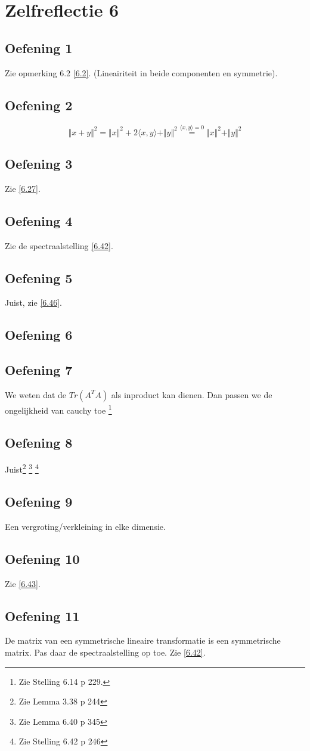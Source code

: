 \documentclass[lineaire_algebra_oplossingen.tex]{subfiles}
\begin{document}
\section{Zelfreflectie 6}
\subsection{Oefening 1}
Zie opmerking 6.2 \ref{6.2}. (Lineairiteit in beide componenten en symmetrie).

\subsection{Oefening 2}
\[
\Vert x+y \Vert^2 = \Vert x\Vert^2 + 2\langle x,y \rangle+ \Vert y\Vert^2 \overset{\langle x,y \rangle = 0}{=}\Vert x\Vert^2 + \Vert y\Vert^2
\]

\subsection{Oefening 3}
Zie \ref{6.27}.

\subsection{Oefening 4}
Zie de spectraalstelling \ref{6.42}.

\subsection{Oefening 5}
Juist, zie \ref{6.46}.

\subsection{Oefening 6}

\subsection{Oefening 7}
We weten dat de $Tr(A^T A)$ als inproduct kan dienen. Dan passen we de ongelijkheid van cauchy toe \footnote{Zie Stelling 6.14 p 229.}

\subsection{Oefening 8}
Juist\footnote{Zie Lemma 3.38 p 244} \footnote{Zie Lemma 6.40 p 345} \footnote{Zie Stelling 6.42 p 246}

\subsection{Oefening 9}
Een vergroting/verkleining in elke dimensie.

\subsection{Oefening 10}
Zie \ref{6.43}.

\subsection{Oefening 11}
De matrix van een symmetrische lineaire transformatie is een symmetrische matrix. Pas daar de spectraalstelling op toe. Zie \ref{6.42}.
\end{document}

